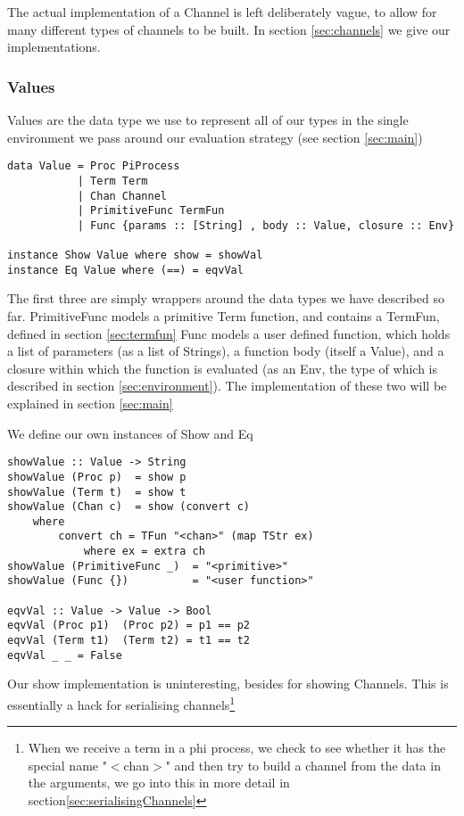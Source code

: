 The actual implementation of a Channel is left deliberately vague, to allow for many different types of channels to be built. In section \ref{sec:channels} we give our implementations.

\subsubsection{Values}
\label{sec:values}
Values are the data type we use to represent all of our types in the single environment we pass around our evaluation strategy (see section \ref{sec:main})

\begin{verbatim}
data Value = Proc PiProcess 
           | Term Term
           | Chan Channel
           | PrimitiveFunc TermFun
           | Func {params :: [String] , body :: Value, closure :: Env}

instance Show Value where show = showVal
instance Eq Value where (==) = eqvVal
\end{verbatim}

The first three are simply wrappers around the data types we have described so far.
PrimitiveFunc models a primitive Term function, and contains a TermFun, defined in section \ref{sec:termfun}
Func models a user defined function, which holds a list of parameters (as a list of Strings), a function body (itself a Value), and a closure within which the function is evaluated (as an Env, the type of which is described in section \ref{sec:environment}). The implementation of these two will be explained in section \ref{sec:main}

We define our own instances of Show and Eq

\begin{verbatim}
showValue :: Value -> String
showValue (Proc p)  = show p
showValue (Term t)  = show t
showValue (Chan c)  = show (convert c)
    where 
        convert ch = TFun "<chan>" (map TStr ex) 
            where ex = extra ch
showValue (PrimitiveFunc _)  = "<primitive>" 
showValue (Func {})          = "<user function>"  

eqvVal :: Value -> Value -> Bool
eqvVal (Proc p1)  (Proc p2) = p1 == p2
eqvVal (Term t1)  (Term t2) = t1 == t2
eqvVal _ _ = False
\end{verbatim}

Our show implementation is uninteresting, besides for showing Channels. This is essentially a hack for serialising channels\footnote{When we receive a term in a phi process, we check to see whether it has the special name "$<$chan$>$" and then try to build a channel from the data in the arguments, we go into this in more detail in section\ref{sec:serialisingChannels}}

